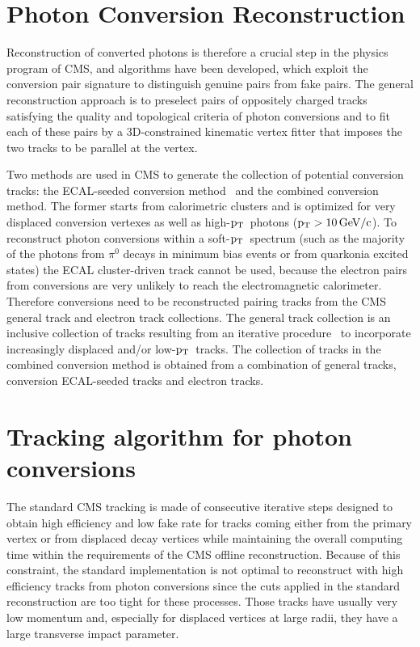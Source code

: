 \documentclass[a4paper]{jpconf}
\def \pt{$\p_{\rm T}$~}
\begin{document}

\section{Photon Conversion Reconstruction}
\label{standard}


Reconstruction of converted photons is therefore a crucial step in the physics program of CMS, and  algorithms have been developed, which exploit the conversion pair signature to distinguish genuine pairs from fake pairs.
%
The general reconstruction approach is to preselect pairs of oppositely charged tracks satisfying the quality and topological criteria of photon conversions and to fit each of these pairs by a 3D-constrained kinematic vertex 
fitter that imposes the two tracks to be parallel at the vertex. 

Two methods are used in CMS to generate the collection of potential conversion tracks: the ECAL-seeded conversion method~\cite{EGM-10-005}  and the combined conversion method. The former starts from calorimetric clusters and is optimized for very displaced conversion vertexes as well as high-\pt photons ($\rm p_{T} >10{\rm \, GeV}/c$).
To reconstruct photon conversions within a soft-\pt spectrum (such as the majority of the photons from $\pi^0$ decays in minimum bias events or from quarkonia excited states) the ECAL cluster-driven track cannot be used,  because the electron pairs from conversions are very unlikely to reach the electromagnetic calorimeter.
Therefore  conversions need to be reconstructed pairing tracks from the  CMS general track and electron track collections.
The general track collection is 
 an inclusive collection of   tracks resulting from an iterative procedure~\cite{TRK-10-001} to incorporate increasingly displaced and/or low-\pt tracks.
%
 The collection of tracks in the combined conversion method is obtained from a combination of general tracks,  conversion ECAL-seeded tracks and electron tracks.


\section{Tracking algorithm for photon conversions}
\label{sec:newSeedingStep}
 

The standard CMS tracking is made of consecutive iterative steps designed to obtain high efficiency and low fake rate for
tracks coming either from the primary vertex or from displaced decay
vertices while maintaining the overall computing time within the
requirements of the CMS offline reconstruction.
Because of this constraint, the standard implementation is not optimal
to reconstruct with high efficiency tracks from photon conversions
since the cuts applied in the standard
reconstruction are too tight for these processes. Those
tracks have usually very low momentum and, especially for displaced
vertices at large radii, they have a large transverse impact parameter.
\end{document}
